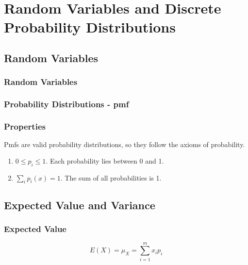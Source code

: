 \chapter{Random Variables and Discrete Probability Distributions}  %

    \section{Random Variables}  %
        \subsection{Random Variables}  %

        \subsection{Probability Distributions - pmf}  %

        \subsection{Properties}  %
            Pmfs are valid probability distributions, so they follow the axioms of probability.
            \begin{enumerate}
                \item $0\leq p_i\leq 1$. Each probability lies between 0 and 1.
                \item $\sum_i p_i(x)=1$. The sum of all probabilities is 1.
            \end{enumerate}

    \section{Expected Value and Variance}  %

        \subsection{Expected Value}  %
            \begin{equation} E(X)=\mu_X=\sum^m_{i=1} x_ip_i \end{equation}

